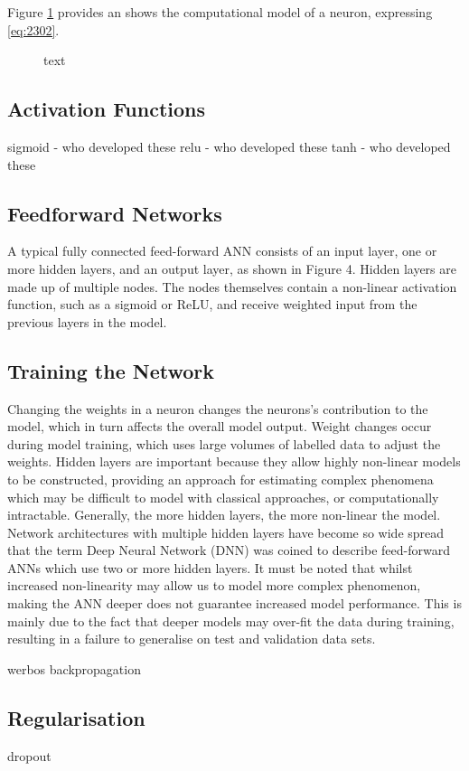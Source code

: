 Figure \ref{fig:2301_perceptron_model} provides an shows the computational model of a neuron, expressing \ref{eq:2302}.

\begin{figure}[h]
	\centering
	
	\caption{text}
	\label{fig:2301_perceptron_model}
\end{figure}



\subsection{Activation Functions}
sigmoid - who developed these
relu - who developed these
tanh - who developed these



\subsection{Feedforward Networks}
A typical fully connected feed-forward ANN consists of an input layer, one or more hidden layers, and an output layer, as shown in Figure 4. Hidden layers are made up of multiple nodes. The nodes themselves contain a non-linear activation function, such as a sigmoid or ReLU, and receive weighted input from the previous layers in the model.



\subsection{Training the Network}
Changing the weights in a neuron changes the neurons’s contribution to the model, which in turn affects the overall model output. Weight changes occur during model training, which uses large volumes of labelled data to adjust the weights. Hidden layers are important because they allow highly non-linear models to be constructed, providing an approach for estimating complex phenomena which may be difficult to model with classical approaches, or computationally intractable. Generally, the more hidden layers, the more non-linear the model. Network architectures with multiple hidden layers have become so wide spread that the term Deep Neural Network (DNN) was coined to describe feed-forward ANNs which use two or more hidden layers. It must be noted that whilst increased non-linearity may allow us to model more complex phenomenon, making the ANN deeper does not guarantee increased model performance. This is mainly due to the fact that deeper models may over-fit the data during training, resulting in a failure to generalise on test and validation data sets.

werbos backpropagation



\subsection{Regularisation}
dropout